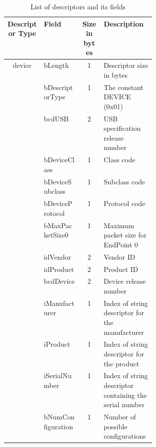 \begin{table}[ht]
    \centering
    \begin{tabular}{|c|l|c|p{0.35\linewidth}|} \hline
        \textbf{Descriptor Type} & \textbf{Field} & \thead{\textbf{Size} \\ \textbf{in bytes}} & \textbf{Description} \\ \hline
        \multirow{14}{*}{device} & bLength & 1 & Descriptor size in bytes \\ \cline{2-4}
          & bDescriptorType & 1 & The constant DEVICE (0x01) \\ \cline{2-4} 
          & bcdUSB          & 2 & USB specification release number \\ \cline{2-4}
          & bDeviceClass    & 1 & Class code \\ \cline{2-4}
          & bDeviceSubclass & 1 & Subclass code \\ \cline{2-4}
          & bDeviceProtocol & 1 & Protocol code \\ \cline{2-4}
          & bMaxPacketSize0 & 1 & Maximum packet size for EndPoint 0 \\ \cline{2-4}
          & idVendor        & 2 & Vendor ID \\ \cline{2-4}
          & idProduct       & 2 & Product ID \\ \cline{2-4}
          & bcdDevice       & 2 & Device release number \\ \cline{2-4}
          & iManufacturer   & 1 & Index of string descriptor for the manufacturer \\ \cline{2-4}
          & iProduct        & 1 & Index of string descriptor for the product \\ \cline{2-4}
          & iSerialNumber   & 1 & Index of string descriptor containing the serial number\\ \cline{2-4}
          & bNumConfiguration & 1 & Number of possible configurations \\ \hline
    \end{tabular}
    \caption{List of descriptors and its fields}
    \label{tab:list_descriptors}
\end{table}

